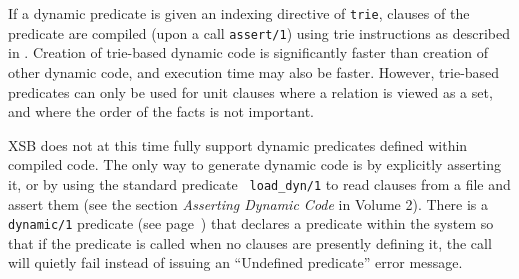 If a dynamic predicate is given an indexing directive of {\tt trie},
clauses of the predicate are compiled (upon a call {\tt assert/1})
using trie instructions as described in \cite{RRSSW98}.  Creation of
trie-based dynamic code is significantly faster than creation of other
dynamic code, and execution time may also be faster.  However,
trie-based predicates can only be used for unit clauses where a
relation is viewed as a set, and where the order of the facts is not
important.

XSB does not at this time fully support dynamic predicates defined
within compiled code.  The only way to generate dynamic code is by
explicitly asserting it, or by using the standard predicate {\tt
  load\_dyn/1} to read clauses from a file and assert them (see the
section {\it Asserting Dynamic Code} in Volume 2).  There is a {\tt
  dynamic/1} predicate (see page~\pageref{dynamic/1}) that declares a
predicate within the system so that if the predicate is called when no
clauses are presently defining it, the call will quietly fail instead
of issuing an {\sf ``Undefined predicate''} error message.

